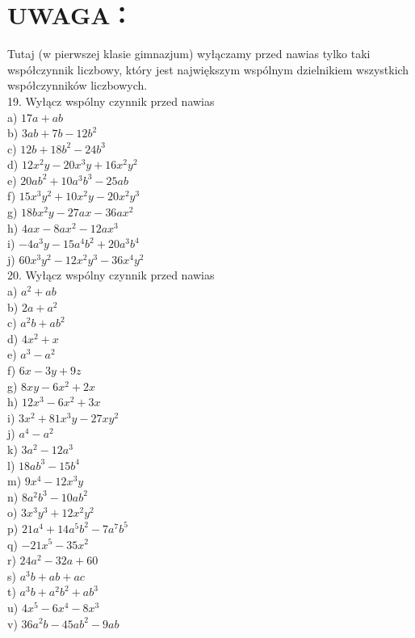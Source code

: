 \documentclass[10pt]{article}
\begin{document}
\section*{UWAGA：}
Tutaj (w pierwszej klasie gimnazjum) wyłączamy przed nawias tylko taki współczynnik liczbowy, który jest największym wspólnym dzielnikiem wszystkich współczynników liczbowych.\\
19. Wyłącz wspólny czynnik przed nawias\\
a) \(17 a+a b\)\\
b) \(3 a b+7 b-12 b^{2}\)\\
c) \(12 b+18 b^{2}-24 b^{3}\)\\
d) \(12 x^{2} y-20 x^{3} y+16 x^{2} y^{2}\)\\
e) \(20 a b^{2}+10 a^{3} b^{3}-25 a b\)\\
f) \(15 x^{3} y^{2}+10 x^{2} y-20 x^{2} y^{3}\)\\
g) \(18 b x^{2} y-27 a x-36 a x^{2}\)\\
h) \(4 a x-8 a x^{2}-12 a x^{3}\)\\
i) \(-4 a^{3} y-15 a^{4} b^{2}+20 a^{3} b^{4}\)\\
j) \(60 x^{3} y^{2}-12 x^{2} y^{3}-36 x^{4} y^{2}\)\\
20. Wyłącz wspólny czynnik przed nawias\\
a) \(a^{2}+a b\)\\
b) \(2 a+a^{2}\)\\
c) \(a^{2} b+a b^{2}\)\\
d) \(4 x^{2}+x\)\\
e) \(a^{3}-a^{2}\)\\
f) \(6 x-3 y+9 z\)\\
g) \(8 x y-6 x^{2}+2 x\)\\
h) \(12 x^{3}-6 x^{2}+3 x\)\\
i) \(3 x^{2}+81 x^{3} y-27 x y^{2}\)\\
j) \(a^{4}-a^{2}\)\\
k) \(3 a^{2}-12 a^{3}\)\\
l) \(18 a b^{3}-15 b^{4}\)\\
m) \(9 x^{4}-12 x^{3} y\)\\
n) \(8 a^{2} b^{3}-10 a b^{2}\)\\
o) \(3 x^{3} y^{3}+12 x^{2} y^{2}\)\\
p) \(21 a^{4}+14 a^{5} b^{2}-7 a^{7} b^{5}\)\\
q) \(-21 x^{5}-35 x^{2}\)\\
r) \(24 a^{2}-32 a+60\)\\
s) \(a^{3} b+a b+a c\)\\
t) \(a^{3} b+a^{2} b^{2}+a b^{3}\)\\
u) \(4 x^{5}-6 x^{4}-8 x^{3}\)\\
v) \(36 a^{2} b-45 a b^{2}-9 a b\)
\end{document}
